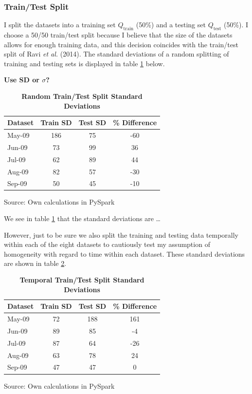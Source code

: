 \documentclass[11pt,preprint, authoryear]{article}
\numberwithin{equation}{section}
\begin{document}
\subsubsection{Train/Test Split}\label{traintest-split}

I split the datasets into a training set \(Q_\text{train}\) (50\%) and a
testing set \(Q_\text{test}\) (50\%). I choose a 50/50 train/test split
because I believe that the size of the datasets allows for enough
training data, and this decision coincides with the train/test split of
Ravi \emph{et al.} (2014). The standard deviations of a random splitting
of training and testing sets is displayed in table \ref{tab:rand_tr_te}
below.

\textbf{Use SD or \(\sigma\)?}

\footnotesize

\begin{longtable}[htbp] {@{} lccc @{}} 
\caption{\textbf{Random Train/Test Split Standard Deviations}} 
\label{tab:rand_tr_te} \\
\toprule
\textbf{Dataset} &  \textbf{Train SD} &  \textbf{Test SD} & \textbf{\% Difference} \\
\midrule
May-09 & 186 & 75 & -60 \\
Jun-09 & 73 & 99 & 36 \\
Jul-09 & 62 & 89 & 44 \\
Aug-09 & 82 & 57 & -30 \\
Sep-09 & 50 & 45 & -10 \\
\bottomrule
\end{longtable}\begin{center} Source: Own calculations in PySpark\end{center}

\normalsize

We see in table \ref{tab:rand_tr_te} that the standard deviations are
\ldots{}

However, just to be sure we also split the training and testing data
temporally within each of the eight datasets to cautiously test my
assumption of homogeneity with regard to time within each dataset. These
standard deviations are shown in table \ref{tab:time_tr_te}.

\footnotesize

\begin{longtable}[htbp] {@{} lccc @{}} 
\caption{\textbf{Temporal Train/Test Split Standard Deviations}} 
\label{tab:time_tr_te} \\
\toprule
\textbf{Dataset} &  \textbf{Train SD} &  \textbf{Test SD} & \textbf{\% Difference} \\
\midrule
May-09 & 72 & 188 & 161 \\
Jun-09 & 89 & 85 & -4 \\
Jul-09 & 87 & 64 & -26 \\
Aug-09 & 63 & 78 & 24 \\
Sep-09 & 47 & 47 & 0 \\
\bottomrule
\end{longtable}\begin{center} Source: Own calculations in PySpark\end{center}
\end{document}
